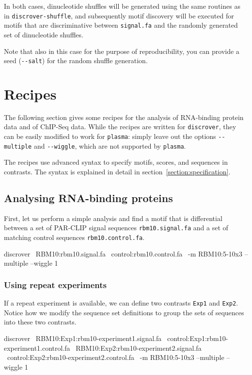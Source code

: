 \documentclass[a4paper]{article}
\newcommand{\plasma}[0]{\texttt{plasma}}
\newcommand{\discrover}[0]{\texttt{discrover}}
\newcommand{\dinuclshuffle}[0]{\texttt{discrover-shuffle}}
\begin{document}
In both cases, dinucleotide shuffles will be generated using the same routines as in \dinuclshuffle{}, and subsequently motif discovery will be executed for motifs that are discriminative between \verb|signal.fa| and the randomly generated set of dinucleotide shuffles.

Note that also in this case for the purpose of reproducibility, you can provide a seed (\verb|--salt|) for the random shuffle generation.


\section{Recipes}
The following section gives some recipes for the analysis of RNA-binding protein data and of ChIP-Seq data.
While the recipes are written for \discrover{}, they can be easily modified to work for \plasma{}:
simply leave out the options \verb|--multiple| and \verb|--wiggle|, which are not supported by \plasma{}.

The recipes use advanced syntax to specify motifs, scores, and sequences in contrasts.
The syntax is explained in detail in section~\ref{section:specification}.

\subsection{Analysing RNA-binding proteins}
First, let us perform a simple analysis and find a motif that is differential between a set of PAR-CLIP signal sequences \verb|rbm10.signal.fa| and a set of matching control sequences \verb|rbm10.control.fa|.
\\
\begin{verbbox}
discrover \
RBM10:rbm10.signal.fa \
control:rbm10.control.fa \
-m RBM10:5-10x3 --multiple --wiggle 1
\end{verbbox}
\fbox{\theverbbox[t]}

\subsubsection{Using repeat experiments}
If a repeat experiment is available, we can define two contrasts \verb|Exp1| and \verb|Exp2|.
Notice how we modify the sequence set definitions to group the sets of sequences into these two contrasts.
\\
\begin{verbbox}
discrover \
RBM10:Exp1:rbm10-experiment1.signal.fa \
control:Exp1:rbm10-experiment1.control.fa \
RBM10:Exp2:rbm10-experiment2.signal.fa \
control:Exp2:rbm10-experiment2.control.fa \
-m RBM10:5-10x3 --multiple --wiggle 1
\end{verbbox}
\fbox{\theverbbox[t]}
\end{document}
